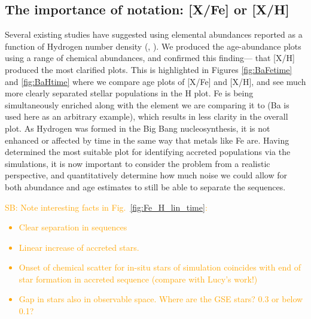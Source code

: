 \documentclass[fleqn,usenatbib]{mnras}
\newcommand{\SB}[1]{{\textcolor{orange}{SB: #1}}}
\begin{document}
\subsection{The importance of notation: [X/Fe] or [X/H]}
Several existing studies have suggested using elemental abundances reported as a function of Hydrogen number density (\citet{Fuhrmann2017}, \citet{Feuillet2021}). We produced the age-abundance plots using a range of chemical abundances, and confirmed this finding— that [X/H] produced the most clarified plots. This is highlighted in Figures \ref{fig:BaFetime} and \ref{fig:BaHtime} where we compare age plots of [X/Fe] and [X/H], and see much more clearly separated stellar populations in the H plot. Fe is being simultaneously enriched along with the element we are comparing it to (Ba is used here as an arbitrary example), which results in less clarity in the overall plot. As Hydrogen was formed in the Big Bang nucleosynthesis, it is not enhanced or affected by time in the same way that metals like Fe are. Having determined the most suitable plot for identifying accreted populations via the simulations, it is now important to consider the problem from a realistic perspective, and quantitatively determine how much noise we could allow for both abundance and age estimates to still be able to separate the sequences. \par 

\SB{Note interesting facts in Fig.~\ref{fig:Fe_H_lin_time}:
\begin{itemize}
    \item Clear separation in sequences
    \item Linear increase of accreted stars.
    \item Onset of chemical scatter for in-situ stars of simulation coincides with end of star formation in accreted sequence (compare with Lucy's work!)
    \item Gap in stars also in observable space. Where are the GSE stars? 0.3 or below 0.1?
\end{itemize}
}

\end{document}
